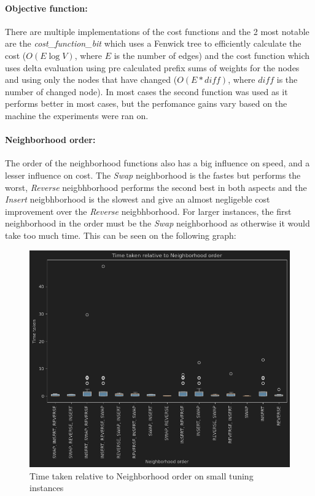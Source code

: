 \documentclass{article}
\begin{document}
\paragraph{Objective function:}
There are multiple implementations of the cost functions and the 2 most notable are the \textit{cost\_function\_bit} which uses a Fenwick tree to efficiently calculate the cost ($O(E \log V)$, where $E$ is the number of edges) and the cost function which uses delta evaluation using pre calculated prefix sums of weights for the nodes and using only the nodes that have changed ($O(E*diff)$, where $diff$ is the number of changed node). In most cases the second function was used as it performs better in most cases, but the perfomance gains vary based on the machine the experiments were ran on.

\paragraph{Neighborhood order:}
The order of the neighborhood functions also has a big influence on speed, and a lesser influence on cost. The \textit{Swap} neighborhood is the fastes but performs the worst, \textit{Reverse} neigbhborhood performs the second best in both aspects and the \textit{Insert} neigbhborhood is the slowest and give an almost negligeble cost improvement over the \textit{Reverse} neigbhborhood. For larger instances, the first neighborhood in the order must be the \textit{Swap} neighborhood as otherwise it would take too much time. This can be seen on the following graph:
\begin{figure}[H]
	\includegraphics[width=\linewidth]{time_norder_vnd_small.png}
	\caption{Time taken relative to Neighborhood order on small tuning instances}
\end{figure}
\end{document}
